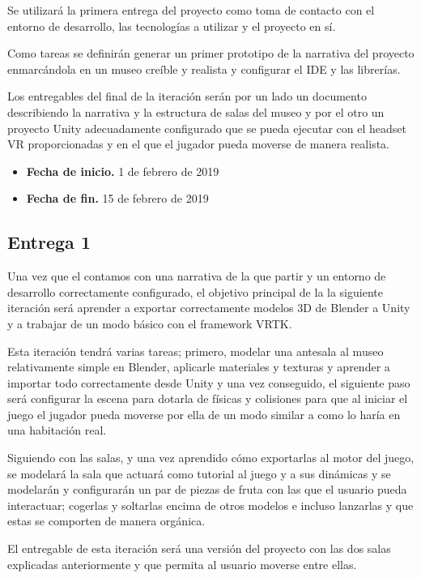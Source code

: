 Se utilizará la primera entrega del proyecto como toma de contacto con el entorno de desarrollo, las tecnologías a utilizar y el proyecto en sí.

Como tareas se definirán generar un primer prototipo de la narrativa del proyecto enmarcándola en un museo creíble y realista y configurar el \acs{IDE} y las librerías.

Los entregables del final de la iteración serán por un lado un documento describiendo la narrativa y la estructura de salas del museo y por el otro un proyecto Unity adecuadamente configurado que se pueda ejecutar con el headset \acs{VR} proporcionadas y en el que el jugador pueda moverse de manera realista.

\begin{itemize}
    \item \textbf{Fecha de inicio.} 1 de febrero de 2019
    \item \textbf{Fecha de fin.} 15 de febrero de 2019
\end{itemize}

\subsection{Entrega 1}

Una vez que el contamos con una narrativa de la que partir y un entorno de desarrollo correctamente configurado, el objetivo principal de la la siguiente iteración será aprender a exportar correctamente modelos 3D de Blender a Unity y a trabajar de un modo básico con el framework \acs{VRTK}.

Esta iteración tendrá varias tareas; primero, modelar una antesala al museo relativamente simple en Blender, aplicarle materiales y texturas y aprender a importar todo correctamente desde Unity y una vez conseguido, el siguiente paso será configurar la escena para dotarla de físicas y colisiones para que al iniciar el juego el jugador pueda moverse por ella de un modo similar a como lo haría en una habitación real.

Siguiendo con las salas, y una vez aprendido cómo exportarlas al motor del juego, se modelará la sala que actuará como tutorial al juego y a sus dinámicas y se modelarán y configurarán un par de piezas de fruta con las que el usuario pueda interactuar; cogerlas y soltarlas encima de otros modelos e incluso lanzarlas y que estas se comporten de manera orgánica.

El entregable de esta iteración será una versión del proyecto con las dos salas explicadas anteriormente y que permita al usuario moverse entre ellas.

